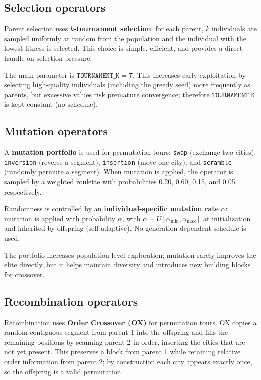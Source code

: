 \documentclass[a4paper,10pt]{article}
\begin{document}
\subsection{Selection operators}

Parent selection uses \textbf{$k$-tournament selection}: for each parent, $k$ individuals are sampled uniformly
at random from the population and the individual with the lowest fitness is selected. This choice is simple,
efficient, and provides a direct handle on selection pressure.

The main parameter is $\texttt{TOURNAMENT\_K}=7$. This increases early
exploitation by selecting high-quality individuals (including the greedy seed) more frequently as parents, but
excessive values risk premature convergence; therefore $\texttt{TOURNAMENT\_K}$ is kept constant (no schedule).


\subsection{Mutation operators}

A \textbf{mutation portfolio} is used for permutation tours: \texttt{swap} (exchange two cities),
\texttt{inversion} (reverse a segment), \texttt{insertion} (move one city), and \texttt{scramble} (randomly
permute a segment). When mutation is applied, the operator is sampled by a weighted roulette with probabilities
0.20, 0.60, 0.15, and 0.05 respectively.

Randomness is controlled by an \textbf{individual-specific mutation rate} $\alpha$: mutation is applied with
probability $\alpha$, with $\alpha \sim U[\alpha_{\min},\alpha_{\max}]$ at initialization and inherited by
offspring (self-adaptive). No generation-dependent schedule is used.

The portfolio increases population-level exploration; mutation rarely improves the elite directly, but it helps
maintain diversity and introduces new building blocks for crossover.



\subsection{Recombination operators}

Recombination uses \textbf{Order Crossover (OX)} for permutation tours. OX copies a random contiguous segment
from parent 1 into the offspring and fills the remaining positions by scanning parent 2 in order, inserting the
cities that are not yet present. This preserves a block from parent 1 while retaining relative order information
from parent 2; by construction each city appears exactly once, so the offspring is a valid permutation.
\end{document}
